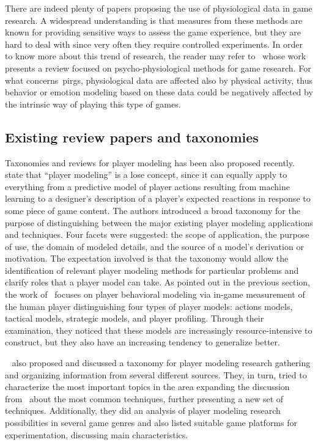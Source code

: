 There are indeed plenty of papers proposing the use of physiological data in game research. A widespread understanding is that measures from these methods are known for providing sensitive ways to assess the game experience, but they are hard to deal with since very often they require controlled experiments. In order to know more about this trend of research, the reader may refer to~\cite{kivikangas_review_2011} whose work presents a review focused on psycho-physiological methods for game research. For what concerns~\gls{pirg}s, physiological data are affected also by physical activity, thus behavior or emotion modeling based on these data could be negatively affected by the intrinsic way of playing this type of games.   
 
\subsection{Existing review papers and taxonomies}\label{reviews}
Taxonomies and reviews for player modeling has been also proposed recently.~\cite{smith_inclusive_2011} state that ``player modeling'' is a lose concept, since it can equally apply to everything from a predictive model of player actions resulting from machine learning to a designer's description of a player's expected reactions in response to some piece of game content. The authors introduced a broad taxonomy for the purpose of distinguishing between the major existing player modeling applications and techniques. Four facets were suggested: the scope of application, the purpose of use, the domain of modeled details, and the source of a model's derivation or motivation. The expectation involved is that the taxonomy would allow the identification of relevant player modeling methods for particular problems and clarify roles that a player model can take. As pointed out in the previous section, the work of~\cite{bakkes_player_2012} focuses on player behavioral modeling via in-game measurement of the human player distinguishing four types of player models: actions models, tactical models, strategic models, and player profiling. Through their examination, they noticed that these models are increasingly resource-intensive to construct, but they also have an increasing tendency to generalize better.%

~\cite{machado_player_2011} also proposed and discussed a taxonomy for player modeling research gathering and organizing information from several different sources. They, in turn, tried to characterize the most important topics in the area expanding the discussion from~\cite{herik_opponent_2005} about the most common techniques, further presenting a new set of techniques. Additionally, they did an analysis of player modeling research possibilities in several game genres and also listed suitable game platforms for experimentation, discussing main characteristics.

